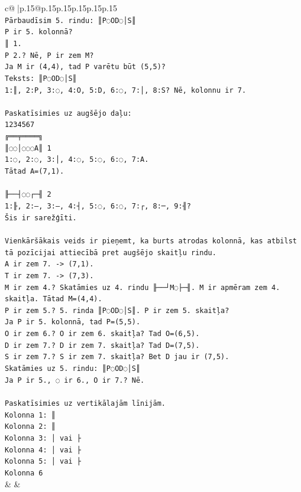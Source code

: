 \documentclass{article}
\begin{document}
{\begin{supertabular}{c@{$\;$}|p{.15\linewidth}@{}p{.15\linewidth}p{.15\linewidth}p{.15\linewidth}p{.15\linewidth}p{.15\linewidth}}
{{{\\ 
\texttt{Pārbaudīsim 5. rindu: ║P◌OD◌│S║} \\
\texttt{P ir 5. kolonnā?} \\
\texttt{║ 1.} \\
\texttt{P 2.? Nē, P ir zem M?} \\
\texttt{Ja M ir (4,4), tad P varētu būt (5,5)?} \\
\texttt{Teksts: ║P◌OD◌│S║} \\
\texttt{1:║, 2:P, 3:◌, 4:O, 5:D, 6:◌, 7:│, 8:S? Nē, kolonnu ir 7.} \\
\\ 
\texttt{Paskatīsimies uz augšējo daļu:} \\
\texttt{1234567} \\
\texttt{╔══╤════╗} \\
\texttt{║◌◌│◌◌◌A║ 1} \\
\texttt{1:◌, 2:◌, 3:│, 4:◌, 5:◌, 6:◌, 7:A.} \\
\texttt{Tātad A=(7,1).} \\
\\ 
\texttt{╟──┤◌◌┌─╢ 2} \\
\texttt{1:╟, 2:–, 3:–, 4:┤, 5:◌, 6:◌, 7:┌, 8:─, 9:╢?} \\
\texttt{Šis ir sarežģīti.} \\
\\ 
\texttt{Vienkāršākais veids ir pieņemt, ka burts atrodas kolonnā, kas atbilst tā pozīcijai attiecībā pret augšējo skaitļu rindu.} \\
\texttt{A ir zem 7. {-}> (7,1).} \\
\texttt{T ir zem 7. {-}> (7,3).} \\
\texttt{M ir zem 4.? Skatāmies uz 4. rindu ╟──┘M◌├─╢. M ir apmēram zem 4. skaitļa. Tātad M=(4,4).} \\
\texttt{P ir zem 5.? 5. rinda ║P◌OD◌│S║. P ir zem 5. skaitļa?} \\
\texttt{Ja P ir 5. kolonnā, tad P=(5,5).} \\
\texttt{O ir zem 6.? O ir zem 6. skaitļa? Tad O=(6,5).} \\
\texttt{D ir zem 7.? D ir zem 7. skaitļa? Tad D=(7,5).} \\
\texttt{S ir zem 7.? S ir zem 7. skaitļa? Bet D jau ir (7,5).} \\
\texttt{Skatāmies uz 5. rindu: ║P◌OD◌│S║} \\
\texttt{Ja P ir 5., ◌ ir 6., O ir 7.? Nē.} \\
\\ 
\texttt{Paskatīsimies uz vertikālajām līnijām.} \\
\texttt{Kolonna 1: ║} \\
\texttt{Kolonna 2: ║} \\
\texttt{Kolonna 3: │ vai ├} \\
\texttt{Kolonna 4: │ vai ├} \\
\texttt{Kolonna 5: │ vai ├} \\
\texttt{Kolonna 6} \\
            }
        }
    }
    & & \\ \\


\end{supertabular}}
\end{document}
